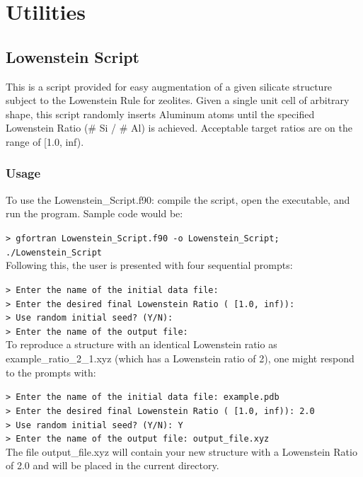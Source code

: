 \chapter{Utilities}

\section{Lowenstein Script} \label{Sec:Lowenstein}
This is a script provided for easy augmentation of a given silicate structure subject to the 
Lowenstein Rule for zeolites.  Given a single unit cell of arbitrary shape, this script randomly inserts Aluminum
atoms until the specified Lowenstein Ratio (\# Si / \# Al) is achieved.  Acceptable target ratios are on the range
of [1.0, inf).

\subsection{Usage} \label{sec:Usage}
To use the Lowenstein\_Script.f90: compile the script, open the executable, and run the program.
Sample code would be:

\texttt{> gfortran Lowenstein\_Script.f90 -o Lowenstein\_Script; ./Lowenstein\_Script} \\

Following this, the user is presented with four sequential prompts:

\texttt{> Enter the name of the initial data file:}  \\
\texttt{> Enter the desired final Lowenstein Ratio ( [1.0, inf)): } \\
\texttt{> Use random initial seed? (Y/N): }\\
\texttt{> Enter the name of the output file: } \\


To reproduce a structure with an identical Lowenstein ratio as example\_ratio\_2\_1.xyz (which has a Lowenstein ratio 
of 2), one might respond to the prompts with:

\texttt{> Enter the name of the initial data file:  example.pdb  }\\
\texttt{> Enter the desired final Lowenstein Ratio ( [1.0, inf)):  2.0  }\\
\texttt{> Use random initial seed? (Y/N): Y  } \\
\texttt{> Enter the name of the output file: output\_file.xyz  } \\

The file output\_file.xyz will contain your new structure with a Lowenstein Ratio of 2.0 and will 
be placed in the current directory.


